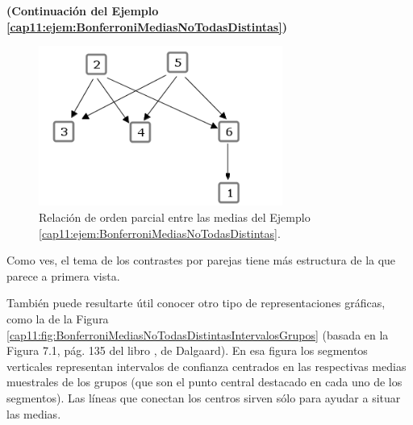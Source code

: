 \begin{ejemplo}{\bf (Continuación del Ejemplo \ref{cap11:ejem:BonferroniMediasNoTodasDistintas})}
\begin{figure}[htbp]
\begin{center}
\includegraphics[width=8cm]{../fig/Cap11-BonferroniMediasNoTodasDistintasRelacionOrdenParcial.png}
\caption{Relación de orden parcial entre las medias del Ejemplo \ref{cap11:ejem:BonferroniMediasNoTodasDistintas}.}
\label{cap11:fig:BonferroniMediasNoTodasDistintasRelacionOrdenParcial}
\end{center}
\end{figure}

Como ves, el tema de los contrastes por parejas tiene más estructura de la que parece a primera vista.

También puede resultarte útil conocer otro tipo de representaciones gráficas, como la de la Figura
\ref{cap11:fig:BonferroniMediasNoTodasDistintasIntervalosGrupos} (basada en la Figura 7.1, pág. 135
del libro \cite{dalgaard2008introductory}, de Dalgaard). En esa figura los segmentos verticales
representan intervalos de confianza centrados en las respectivas medias muestrales de los grupos (que son el punto central destacado en cada uno de los segmentos). Las líneas que conectan los centros sirven sólo para ayudar a
situar las medias.


\end{ejemplo}
